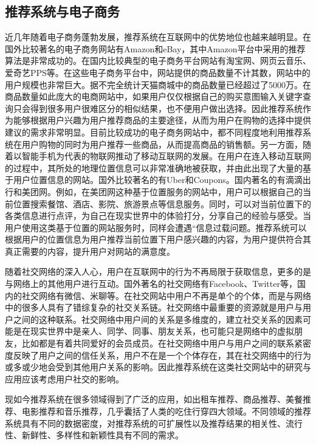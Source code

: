 	\subsection{推荐系统与电子商务}
	近几年随着电子商务蓬勃发展，推荐系统在互联网中的优势地位也越来越明显。在国外比较著名的电子商务网站有Amazon和eBay，其中Amazon平台中采用的推荐算法是非常成功的。在国内比较典型的电子商务平台网站有淘宝网、网页云音乐、爱奇艺PPS等。在这些电子商务平台中，网站提供的商品数量不计其数，网站中的用户规模也非常巨大。据不完全统计天猫商城中的商品数量已经超过了5000万。在商品数量如此庞大的电商网站中，如果用户仅仅根据自己的购买意图输入关键字查询只会得到很多用户很难区分的相似结果，也不便用户做出选择。因此推荐系统作为能够根据用户兴趣为用户推荐商品的主要途径，从而为用户在购物的选择中提供建议的需求非常明显。目前比较成功的电子商务网站中，都不同程度地利用推荐系统在用户购物的同时为用户推荐一些商品，从而提高商品的销售额。另一方面，随着以智能手机为代表的物联网推动了移动互联网的发展。在用户在连入移动互联网的过程中，其所处的地理位置信息可以非常准确地被获取，并由此出现了大量的基于用户位置信息的网站。国外比较著名的有Uber和Coupons。国内著名的有滴滴出行和美团网。例如，在美团网这种基于位置服务的网站中，用户可以根据自己的当前位置搜索餐馆、酒店、影院、旅游景点等信息服务。同时，可以对当前位置下的各类信息进行点评，为自己在现实世界中的体验打分，分享自己的经验与感受。当用户使用这类基于位置的网站服务时，同样会遭遇“信息过载问题。推荐系统可以根据用户的位置信息为用户推荐当前位置下用户感兴趣的内容，为用户提供符合其真正需要的内容，提升用户对网站的满意度。

	随着社交网络的深入人心，用户在互联网中的行为不再局限于获取信息，更多的是与网络上的其他用户进行互动。国外著名的社交网络有Facebook、Twitter等，国内的社交网络有微信、米聊等。在社交网站中用户不再是单个的个体，而是与网络中的很多人具有了错综复杂的社交关系链。社交网络中最重要的资源就是用户与用户之间的这种联系。社交网络中用户间的关系是多维度的，建立社交关系的因素可能是在现实世界中是亲人、同学、同事、朋友关系，也可能只是网络中的虚拟朋友，比如都是有着共同爱好的会员成员。在社交网络中用户与用户之间的联系紧密度反映了用户之间的信任关系，用户不在是一个个体存在，其在社交网络中的行为或多或少地会受到其他用户关系的影响。因此推荐系统在这类社交网站中的研究与应用应该考虑用户社交的影响。

	现如今推荐系统在很多领域得到了广泛的应用，如出租车推荐、商品推荐、美餐推荐、电影推荐和音乐推荐，几乎囊括了人类的吃住行穿四大领域。不同领域的推荐系统具有不同的数据密度，对推荐系统的可扩展性以及推荐结果的相关性、流行性、新鲜性、多样性和新颖性具有不同的需求。

